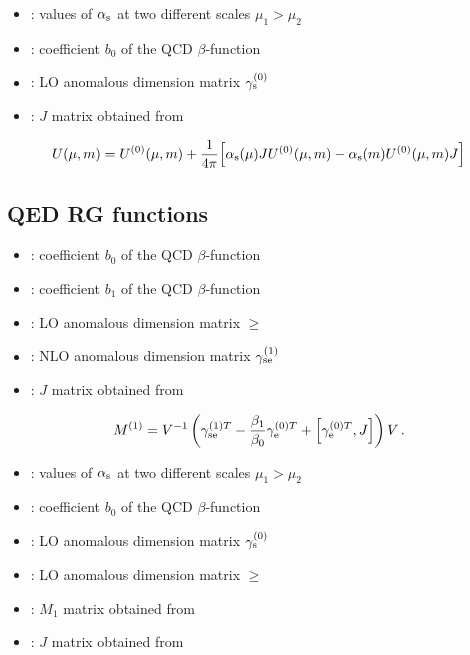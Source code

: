 
\begin{itemize}
\item {}: values of $\alpha_{\rm s}$ at two different scales $\mu_1>\mu_2$
\item {}: coefficient $b_0$ of the QCD $\beta$-function
\item {}: LO anomalous dimension matrix $\gamma_{\rm s}^{(0)}$ 
\item {}: $J$ matrix obtained from 
\end{itemize}

\begin{equation}\label{u0jj}
U(\mu,m)= U^{(0)}(\mu,m) + {1 \over 4\pi} \Big[ \alpha_{\rm s}(\mu) J U^{(0)}(\mu,m) - \alpha_{\rm s}(m) U^{(0)}(\mu,m) J \Big]
\end{equation}

\subsection{QED RG functions}


\begin{itemize}
\item {}: coefficient $b_0$ of the QCD $\beta$-function
\item {}: coefficient $b_1$ of the QCD $\beta$-function
\item {}: LO anomalous dimension matrix $\ge$
\item {}: NLO anomalous dimension matrix $\gamma_{\rm se}^{(1)}$
\item {}: $J$ matrix obtained from 
\end{itemize}

\begin{equation}
M^{(1)} = V^{-1} \left( \gamma_{\rm se}^{(1) T} - \frac{\beta_1}{\beta_0} \gamma_{\rm e}^{(0) T} +
                \left[ \gamma_{\rm e}^{(0) T}, J \right] \right) V \, .
\label{eq:M1}
\end{equation}


\begin{itemize}
\item {}: values of $\alpha_{\rm s}$ at two different scales $\mu_1>\mu_2$
\item {}: coefficient $b_0$ of the QCD $\beta$-function
\item {}: LO anomalous dimension matrix $\gamma_{\rm s}^{(0)}$
\item {}: LO anomalous dimension matrix $\ge$
\item {}: $M_1$ matrix obtained from 
\item {}: $J$ matrix obtained from 
\end{itemize}

